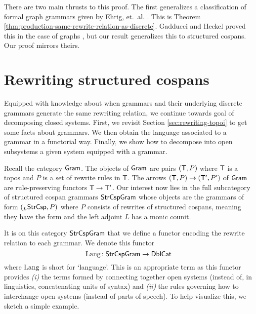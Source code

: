 \documentclass{amsart}
\begin{document}
There are two main thrusts to this proof.  The first
generalizes a classification of formal graph grammars given
by Ehrig, et.~al. \cite{Ehrig_GraphGram}. This is
Theorem \ref{thm:production-same-rewrite-relation-as-discrete}.
Gadducci and Heckel proved this in the case of graphs
\cite{Gadd_IndGraphTrans}, but our result generalizes
this to structured cospans. Our proof mirrors theirs.

\section{Rewriting structured cospans}
\label{sec:RewritingStrCsp}


Equipped with knowledge about when grammars and their
underlying discrete grammars generate the same rewriting
relation, we continue towards goal of decomposing closed
systems. First, we revisit Section \ref{sec:rewriting-topoi}
to get some facts about grammars. We then obtain the
language associated to a grammar in a functorial
way. Finally, we show how to decompose into open subsystems a given system
equipped with a grammar. 

Recall the category $ \mathsf{Gram} $.  The objects of $ \mathsf{Gram} $ are
pairs $ ( \mathsf{T} , P ) $ where $ \mathsf{T} $ is a topos and $ P $ is a
set of rewrite rules in $ \mathsf{T} $.  The arrows
$ (\mathsf{T} , P) \to ( \mathsf{T}' , P' )$ of $ \mathsf{Gram} $ are
rule-preserving functors $ \mathsf{T} \to \mathsf{T}' $.  Our interest now
lies in the full subcategory of structured cospan grammars
$ \mathsf{StrCspGram} $ whose objects are the grammars of form
$ ( _L \mathsf{StrCsp} , P ) $ where $ P $ consists of rewrites of
structured cospans, meaning they have the form
 and the left adjoint
$ L $ has a monic counit.

It is on this category $ \mathsf{StrCspGram} $ that we define a
functor encoding the rewrite relation to each grammar. We
denote this functor
\[
  \mathrm{Lang} \colon \mathsf{StrCspGram} \to \mathsf{DblCat}
\]
where $ \mathrm{Lang} $ is short for `language'. This is an
appropriate term as this functor provides \emph{(i)} the
terms formed by connecting together open systems (instead
of, in linguistics, concatenating units of syntax) and
\emph{(ii)} the rules governing how to interchange open
systems (instead of parts of speech). To help visualize
this, we sketch a simple example.
\end{document}
